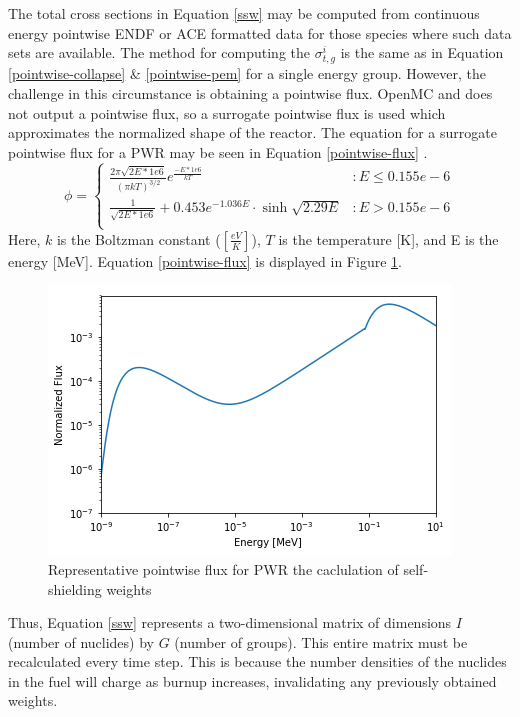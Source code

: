 \documentclass{article}
\begin{document}
The total cross sections in Equation \ref{ssw} may be computed from continuous energy
pointwise ENDF or ACE formatted data for those species where such data sets are available.
The method for computing the  $\sigma_{t,g}^i$ is the same as in Equation
\ref{pointwise-collapse} \& \ref{pointwise-pem} for a single energy group.  However,
the challenge in this circumstance is obtaining a pointwise flux. OpenMC and does not output
a pointwise flux, so a surrogate pointwise flux is used which approximates the normalized shape
of the reactor. The equation for a surrogate pointwise flux for a PWR may be seen in
Equation \ref{pointwise-flux} \cite{spectrum}.
\begin{equation}
\label{pointwise-flux}
\phi =
\begin{cases}
    \frac{2\pi\sqrt{2E*1e6}}{(\pi kT)^{3/2}}e^{\frac{-E*1e6}{kT}} & : E\leq 0.155e-6 \\
    \frac{1}{\sqrt{2E*1e6}} + 0.453e^{-1.036E}\cdot\sinh{\sqrt{2.29E}} & : E > 0.155e-6 \\
\end{cases}
\end{equation}
Here, $k$ is the Boltzman constant ($[\frac{eV}{K}]$), $T$ is the temperature [K],
and E is the energy [MeV]. Equation \ref{pointwise-flux} is displayed in
Figure \ref{fig:therm}.
\begin{figure}[h]
  \center
  \includegraphics[scale=0.6]{thermspec.png}
  \caption{Representative pointwise flux for PWR the caclulation of self-shielding weights}
  \label{fig:therm}
\end{figure}

Thus, Equation \ref{ssw} represents a two-dimensional matrix of dimensions
$I$ (number of nuclides) by $G$ (number of groups). This entire matrix 
must be recalculated every time step. This is because the number densities of the nuclides
in the fuel will charge as burnup increases, invalidating any previously obtained weights.
\end{document}
